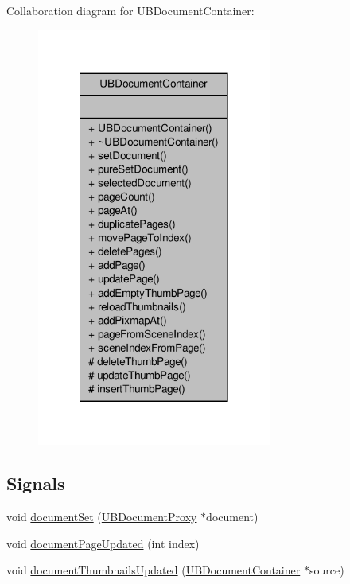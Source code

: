 Collaboration diagram for U\-B\-Document\-Container\-:
\nopagebreak
\begin{figure}[H]
\begin{center}
\leavevmode
\includegraphics[width=218pt]{d3/d54/class_u_b_document_container__coll__graph}
\end{center}
\end{figure}
\subsection*{Signals}
\begin{DoxyCompactItemize}
\item 
void \hyperlink{class_u_b_document_container_a3a55f82506aa66ce1461dee609157862}{document\-Set} (\hyperlink{class_u_b_document_proxy}{U\-B\-Document\-Proxy} $\ast$document)
\item 
void \hyperlink{class_u_b_document_container_ac21fbf1404bb7094ae0094f7382d21c2}{document\-Page\-Updated} (int index)
\item 
void \hyperlink{class_u_b_document_container_afb8a9a176e31db954ae73e74b78b1d6e}{document\-Thumbnails\-Updated} (\hyperlink{class_u_b_document_container}{U\-B\-Document\-Container} $\ast$source)
\end{DoxyCompactItemize}
